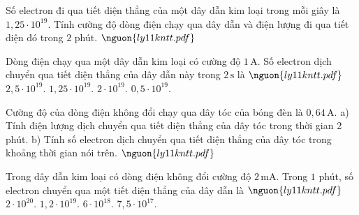 \begin{ex}
Số electron đi qua tiết diện thẳng của một dây dẫn kim loại trong mỗi giây là $1,25\cdot 10^{19}$. Tính cường độ dòng điện chạy qua dây dẫn và điện lượng đi qua tiết diện đó trong $2$ phút. $\nguon{ly11 kntt.pdf}$
\choiceTF

\end{ex}

\begin{ex}
Dòng điện chạy qua một dây dẫn kim loại có cường độ $1\,\mathrm{A}$. Số electron dịch chuyển qua tiết diện thẳng của dây dẫn này trong $2\,\mathrm{s}$ là $\nguon{ly11 kntt.pdf}$
\choice
{$2,5\cdot 10^{19}$.}
{\True $1,25\cdot 10^{19}$.}
{$2\cdot 10^{19}$.}
{$0,5\cdot 10^{19}$.}
\end{ex}

\begin{ex}
Cường độ của dòng điện không đổi chạy qua dây tóc của bóng đèn là $0,64\,\mathrm{A}$. a) Tính điện lượng dịch chuyển qua tiết diện thẳng của dây tóc trong thời gian 2 phút. b) Tính số electron dịch chuyển qua tiết diện thẳng của dây tóc trong khoảng thời gian nói trên. $\nguon{ly11 kntt.pdf}$
\choiceTF

\end{ex}

\begin{ex}
Trong dây dẫn kim loại có dòng điện không đổi cường độ $2\,\mathrm{mA}$. Trong $1$ phút, số electron chuyển qua một tiết diện thẳng của dây dẫn là $\nguon{ly11 kntt.pdf}$
\choice
{$2\cdot 10^{20}$.}
{$1,2\cdot 10^{19}$.}
{$6\cdot 10^{18}$.}
{\True $7,5\cdot 10^{17}$.}
\end{ex}

